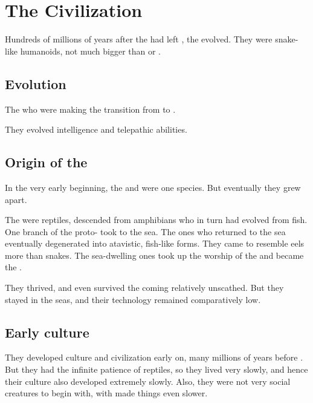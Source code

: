 \section{The \Ophidian{} Civilization}
Hundreds of millions of years after the \voyagers{} had left \Miith{}, the \ophidians{} evolved. 
They were snake-like humanoids, not much bigger than \humans{} or \scathae. 









\subsection{Evolution}
The \ophidians{}  who were making the transition from  to . 

They evolved intelligence and telepathic abilities. 









\subsection{Origin of the \nagae}
In the very early beginning, the \ophidians{} and \nagae{} were one species. 
But eventually they grew apart. 

The \ophidians{} were reptiles, descended from amphibians who in turn had evolved from fish. 
One branch of the proto-\ophidians{} took to the sea. 
The ones who returned to the sea eventually degenerated into atavistic, fish-like forms. 
They came to resemble eels more than snakes. 
The sea-dwelling ones took up the worship of the \Krakens{} and became the \nagae{}.  

They thrived, and even survived the coming \firstbanewar{} relatively unscathed. 
But they stayed in the seas, and their technology remained comparatively low. 









\subsection{Early culture}
They developed culture and civilization early on, many millions of years before \Tiamat. 
But they had the infinite patience of reptiles, so they lived very slowly, and hence their culture also developed extremely slowly. 
Also, they were not very social creatures to begin with, with made things even slower. 

